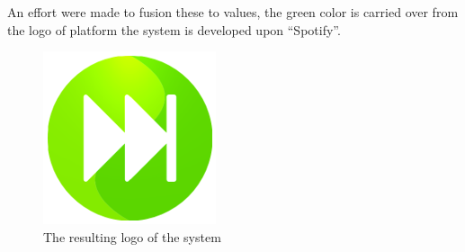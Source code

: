 An effort were made to fusion these to values, the green color is carried over from the logo of platform the system is developed upon \enquote{Spotify}.

\begin{figure}
  \centering
  \includegraphics[width=0.5\linewidth]{Images/Icon.png}
  \caption{The resulting logo of the system}
  \label{fig:logo}
\end{figure}